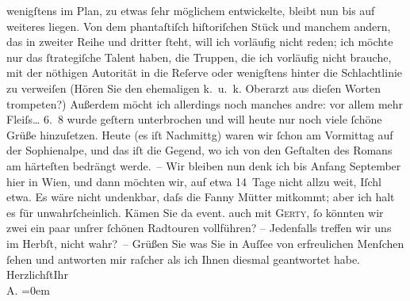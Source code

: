 \begin{ledgroupsized}[t]{13cm}
               wenigſtens im Plan, zu etwas ſehr möglichem entwickelte, {\pb}bleibt nun bis auf weiteres liegen. Von dem phantaſtiſch hiſtoriſchen Stück und manchem andern, das in
               zweiter Reihe und dritter ſteht, will ich vorläufig nicht reden; ich möchte nur das
               ſtrategiſche Talent haben, die Truppen, die ich vorläufig nicht brauche, mit der
               nöthigen Autorität in die Reſerve oder wenigſtens hinter die Schlachtlinie zu
               verweiſen (Hören Sie den ehemaligen k. u. k. Oberarzt aus dieſen Worten trompeten?)
               Außerdem {\pb}möcht ich allerdings noch manches andre: vor
               allem mehr Fleiſs{\dots}\pend
           \pstart
           \raggedleft{}6. 8\pend
           \pstart
           wurde geſtern unterbrochen und will heute nur noch viele ſchöne Grüße hinzuſetzen.
               Heute (es iſt Nachmittg) waren wir ſchon am Vormittag auf
               der Sophienalpe, und das iſt die Gegend, wo ich von
               den Geſtalten des Romans am
               härteſten bedrängt werde. –\pend
           \pstart
           Wir bleiben nun denk ich bis Anfang September hier in Wien, und dann möchten wir, auf etwa 14 Tage nicht allzu weit,
                  Iſchl etwa. Es {\pb}wäre
               nicht undenkbar, daſs die Fanny Mütter mitkommt;
               aber ich halt es für unwahrſcheinlich. Kämen Sie da{\geminationn}
               event. auch mit \textsc{Gerty}, ſo könnten wir zwei ein paar unſrer ſchönen Radtouren vollführen? – Jedenfalls
               treffen wir uns im Herbſt, nicht wahr? –\pend
           \pstart
           Grüßen Sie was Sie in Auſſee von erfreulichen
               Menſchen ſehen und antworten mir raſcher als ich Ihnen diesmal geantwortet habe.\pend
           \pstart
           Herzlichſt\hspace*{1.5em}Ihr{\\[\baselineskip]}\spacefill\mbox{A.}\pend
           \leftskip=0em{}
         
         \endnumbering{}\end{ledgroupsized}  \newcommand{\dateiname}{L01422}\newcommand{\titel}{Arthur Schnitzler an Hugo von Hofmannsthal, 5.–6. 8. 1904}\newcommand{\editorInnen}{Martin Anton Müller und Gerd-Hermann Susen}
      